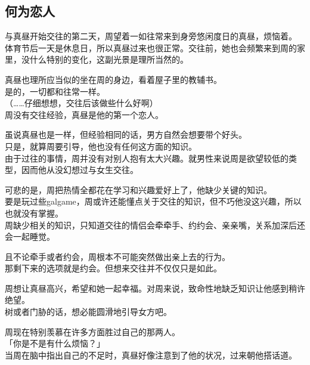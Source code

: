\subsection{何为恋人}

与真昼开始交往的第二天，周望着一如往常来到身旁悠闲度日的真昼，烦恼着。\\

体育节后一天是休息日，所以真昼过来也很正常。交往前，她也会频繁来到周的家里，没什么特别的变化，这副光景是理所当然的。

真昼也理所应当似的坐在周的身边，看着屋子里的教辅书。\\

是的，一切都和往常一样。\\

（……仔细想想，交往后该做些什么好啊）\\

周没有交往经验，真昼是他的第一个恋人。

虽说真昼也是一样，但经验相同的话，男方自然会想要带个好头。\\

只是，就算周要引导，他也没有任何这方面的知识。\\

由于过往的事情，周并没有对别人抱有太大兴趣。就男性来说周是欲望较低的类型，因而他从没幻想过与女生交往。

可悲的是，周把热情全都花在学习和兴趣爱好上了，他缺少关键的知识。\\

要是玩过些galgame，周或许还能懂点关于交往的知识，但不巧他没这兴趣，所以也就没有掌握。\\

周缺少相关的知识，只知道交往的情侣会牵牵手、约约会、亲亲嘴，关系加深后还会一起睡觉。

且不论牵手或者约会，周根本不可能突然做出亲上去的行为。\\

那剩下来的选项就是约会。但想来交往并不仅仅只是如此。

周想让真昼高兴，希望和她一起幸福。对周来说，致命性地缺乏知识让他感到稍许绝望。\\

树或者门胁的话，想必能圆滑地引导女方吧。

周现在特别羡慕在许多方面胜过自己的那两人。\\

「你是不是有什么烦恼？」\\

当周在脑中指出自己的不足时，真昼好像注意到了他的状况，过来朝他搭话道。\\

